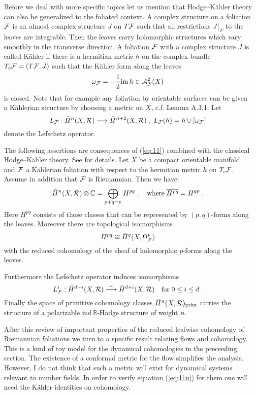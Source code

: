 \documentclass[11pt,leqno]{article}
\newcommand{\C}{{\mathbb{C}}}
\newcommand{\R}{{\mathbb{R}}}
\newcommand{\imm}{\mathrm{im}\,}
\newcommand{\ind}{\mathrm{ind}}
\newcommand{\prim}{\mathrm{prim}}
\newcommand{\Ah}{{\cal A}}
\newcommand{\Fh}{{\cal F}}
\newcommand{\Rh}{{\cal R}}
\newcommand{\oH}{\bar{H}}
\newcommand{\silo}{\stackrel{\sim}{\longrightarrow}}
\newcommand{\halb}{\frac{1}{2}}
\begin{document}
Before we deal with more specific topics let us mention that Hodge--K\"ahler theory can also be generalized to the foliated context. A complex structure on a foliation $\Fh$ is an almost complex structure $J$ on $T \Fh$ such that all restrictions $J \, |_F$ to the leaves are integrable. Then the leaves carry holomorphic structures which vary smoothly in the transverse direction. A foliation $\Fh$ with a complex structure $J$ is called K\"ahler if there is a hermitian metric $h$ on the complex bundle $T_c \Fh = (T \Fh , J)$ such that the K\"ahler form along the leaves
\[
\omega_{\Fh} = - \halb \imm h \in \Ah^2_{\Fh} (X)
\]
is closed. Note that for example any foliation by orientable surfaces can be given a K\"ahlerian structure by choosing a metric on $X$, c.f. \cite{MS} Lemma A.3.1. Let
\[
L_{\Fh} : \oH^n (X,\Rh) \longrightarrow \oH^{n+2} (X,\Rh) \; , \; L_{\Fh} (h) = h \cup [\omega_{\Fh}]
\]
denote the Lefschetz operator.

The following assertions are consequences of (\ref{eq:11}) combined with the classical Hodge--K\"ahler theory. See \cite{DS3} for details. Let $X$ be a compact orientable manifold and $\Fh$ a K\"ahlerian foliation with respect to the hermitian metric $h$ on $T_c \Fh$. Assume in addition that $\Fh$ is Riemannian. Then we have:
\begin{equation}
  \label{eq:16}
  \oH^n (X,\Rh) \otimes \C = \bigoplus_{p+q=n} H^{pq} \; , \quad \mbox{where} \; \overline{H^{pq}} = H^{qp} \; .
\end{equation}
Here $H^{pq}$ consists of those classes that can be represented by $(p,q)$-forms along the leaves. Moreover there are topological isomorphisms
\[
H^{pq} \cong \oH^q (X , \Omega^p_{\Fh})
\]
with the reduced cohomology of the sheaf of holomorphic $p$-forms along the leaves. 

Furthermore the Lefschetz operator induces isomorphisms
\begin{equation}
  \label{eq:17}
  L^i_{\Fh} : \oH^{d-i} (X,\Rh) \silo \oH^{d+i} (X,\Rh) \quad \mbox{for} \; 0 \le i \le d \; .
\end{equation}
Finally the space of primitive cohomology classes $\oH^n (X,\Rh)_{\prim}$ carries the structure of a polarizable $\ind \, \R$-Hodge structure of weight $n$.

After this review of important properties of the reduced leafwise cohomology of Riemannian foliations we turn to a specific result relating flows and cohomology. This is a kind of toy model for the dynamical cohomologies in the preceeding section. The existence of a conformal metric for the flow simplifies the analysis. However, I do not think that such a metric will exist for dynamical systems relevant to number fields. In order to verify equation (\ref{eq:11n}) for them one will need the K\"ahler identities on cohomology.
\end{document}
